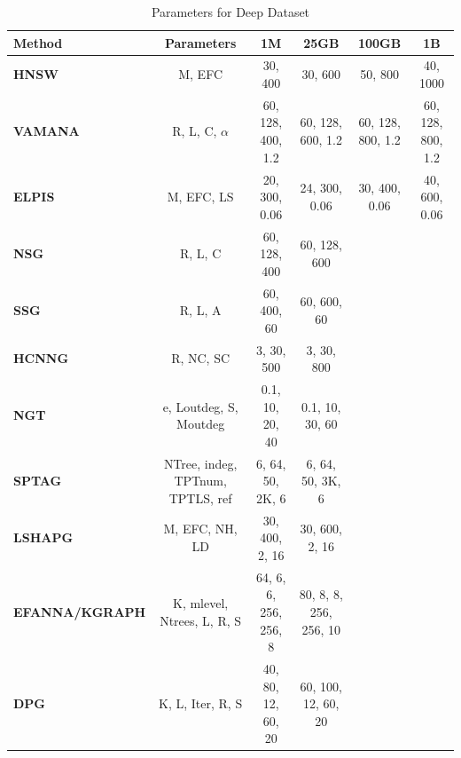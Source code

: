 \begin{table}[h!]
\centering
\caption{Parameters for Deep Dataset}
\scriptsize %
\begin{tabularx}{\textwidth}{lCCCCC}
\toprule
\textbf{Method} & \textbf{Parameters} & \textbf{1M} & \textbf{25GB} & \textbf{100GB} & \textbf{1B} \\
\midrule
\textbf{HNSW} & M, EFC & 30, 400 & 30, 600 & 50, 800 & 40, 1000 \\
\textbf{VAMANA} & R, L, C, $\alpha$ & 60, 128, 400, 1.2 & 60, 128, 600, 1.2 & 60, 128, 800, 1.2 & 60, 128, 800, 1.2 \\
\textbf{ELPIS} & M, EFC, LS & 20, 300, 0.06 & 24, 300, 0.06 & 30, 400, 0.06 & 40, 600, 0.06 \\
\textbf{NSG} & R, L, C & 60, 128, 400 & 60, 128, 600 & & \\
\textbf{SSG} & R, L, A & 60, 400, 60 & 60, 600, 60 & & \\
\textbf{HCNNG} & R, NC, SC & 3, 30, 500 & 3, 30, 800 & & \\
\textbf{NGT} & e, Loutdeg, S, Moutdeg & 0.1, 10, 20, 40 & 0.1, 10, 30, 60 & & \\
\textbf{SPTAG} & NTree, indeg, TPTnum, TPTLS, ref & 6, 64, 50, 2K, 6 & 6, 64, 50, 3K, 6 & & \\
\textbf{LSHAPG} & M, EFC, NH, LD & 30, 400, 2, 16 & 30, 600, 2, 16 & & \\
\textbf{EFANNA/KGRAPH} & K, mlevel, Ntrees, L, R, S & 64, 6, 6, 256, 256, 8 & 80, 8, 8, 256, 256, 10 & & \\
\textbf{DPG} & K, L, Iter, R, S & 40, 80, 12, 60, 20 & 60, 100, 12, 60, 20 & & \\
\bottomrule
\end{tabularx}
\end{table}


